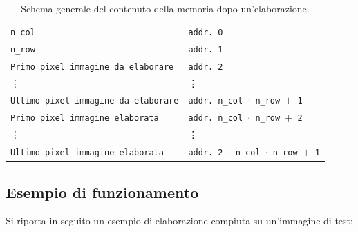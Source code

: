 \documentclass{article}
\begin{document}
\begin{table}[h]
    \centering
    \def\arraystretch{1.3} %
    \caption{Schema generale del contenuto della memoria dopo un'elaborazione.}
    \label{tab:schemamem}

    \begin{tabular}{ |m{4cm} | m{5cm} }
        \cline{1-1}
        \texttt{n\_col}                             & \texttt{addr. 0}                                     \\
        \cline{1-1}
        \texttt{n\_row}                             & \texttt{addr. 1}                                     \\
        \cline{1-1}
        \texttt{Primo pixel immagine da elaborare}  & \texttt{addr. 2}                                     \\
        \cline{1-1}
        \vdots                                      & \vdots                                               \\
        \cline{1-1}
        \texttt{Ultimo pixel immagine da elaborare} & \texttt{addr. n\_col $\cdot$ n\_row $+$ 1}           \\
        \cline{1-1}
        \texttt{Primo pixel immagine elaborata}     & \texttt{addr. n\_col $\cdot$ n\_row $+$ 2}           \\
        \cline{1-1}
        \vdots                                      & \vdots                                               \\
        \cline{1-1}
        \texttt{Ultimo pixel immagine elaborata}    & \texttt{addr. 2 $\cdot$ n\_col $\cdot$ n\_row $+$ 1} \\
        \cline{1-1}
    \end{tabular}
\end{table}
\vspace{0.3cm}

\pagebreak

\subsection{Esempio di funzionamento} %
\label{sec:esempio}
Si riporta in seguito un esempio di elaborazione compiuta su un'immagine di test:
\end{document}
